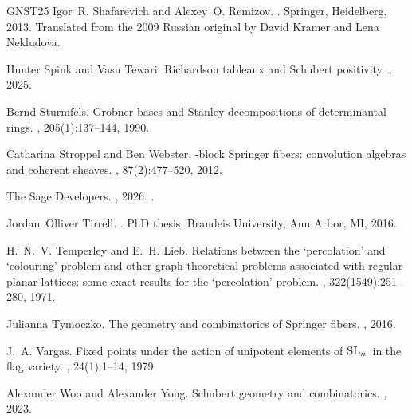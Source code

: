 \documentclass[11pt]{amsart}
\theoremstyle{remark}
\theoremstyle{remark}
\theoremstyle{definition}
\theoremstyle{definition}
\theoremstyle{definition}
\numberwithin{equation}{section}
\begin{document}
\begin{thebibliography}{GNST25}
Igor~R. Shafarevich and Alexey~O. Remizov.
.
\newblock Springer, Heidelberg, 2013.
\newblock Translated from the 2009 Russian original by David Kramer and Lena Nekludova.

Hunter Spink and Vasu Tewari.
\newblock Richardson tableaux and {S}chubert positivity.
, 2025.

Bernd Sturmfels.
\newblock Gr\"obner bases and {S}tanley decompositions of determinantal rings.
, 205(1):137--144, 1990.

Catharina Stroppel and Ben Webster.
-block {S}pringer fibers: convolution algebras and coherent sheaves.
, 87(2):477--520, 2012.

{The Sage Developers}.
, 2026.
.

Jordan~Olliver Tirrell.
.
\newblock PhD thesis, Brandeis University, Ann Arbor, MI, 2016.

H.~N.~V. Temperley and E.~H. Lieb.
\newblock Relations between the `percolation' and `colouring' problem and other graph-theoretical problems associated with regular planar lattices: some exact results for the `percolation' problem.
, 322(1549):251--280, 1971.

Julianna Tymoczko.
\newblock The geometry and combinatorics of {S}pringer fibers.
, 2016.

J.~A. Vargas.
\newblock Fixed points under the action of unipotent elements of {${\rm SL}\sb{n}$}\ in the flag variety.
, 24(1):1--14, 1979.

Alexander Woo and Alexander Yong.
\newblock Schubert geometry and combinatorics.
, 2023.

\end{thebibliography}
\end{document}
